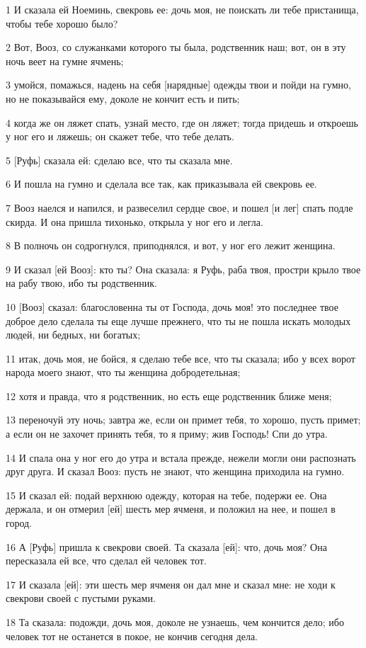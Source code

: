 \par 1 И сказала ей Ноеминь, свекровь ее: дочь моя, не поискать ли тебе пристанища, чтобы тебе хорошо было?
\par 2 Вот, Вооз, со служанками которого ты была, родственник наш; вот, он в эту ночь веет на гумне ячмень;
\par 3 умойся, помажься, надень на себя [нарядные] одежды твои и пойди на гумно, но не показывайся ему, доколе не кончит есть и пить;
\par 4 когда же он ляжет спать, узнай место, где он ляжет; тогда придешь и откроешь у ног его и ляжешь; он скажет тебе, что тебе делать.
\par 5 [Руфь] сказала ей: сделаю все, что ты сказала мне.
\par 6 И пошла на гумно и сделала все так, как приказывала ей свекровь ее.
\par 7 Вооз наелся и напился, и развеселил сердце свое, и пошел [и лег] спать подле скирда. И она пришла тихонько, открыла у ног его и легла.
\par 8 В полночь он содрогнулся, приподнялся, и вот, у ног его лежит женщина.
\par 9 И сказал [ей Вооз]: кто ты? Она сказала: я Руфь, раба твоя, простри крыло твое на рабу твою, ибо ты родственник.
\par 10 [Вооз] сказал: благословенна ты от Господа, дочь моя! это последнее твое доброе дело сделала ты еще лучше прежнего, что ты не пошла искать молодых людей, ни бедных, ни богатых;
\par 11 итак, дочь моя, не бойся, я сделаю тебе все, что ты сказала; ибо у всех ворот народа моего знают, что ты женщина добродетельная;
\par 12 хотя и правда, что я родственник, но есть еще родственник ближе меня;
\par 13 переночуй эту ночь; завтра же, если он примет тебя, то хорошо, пусть примет; а если он не захочет принять тебя, то я приму; жив Господь! Спи до утра.
\par 14 И спала она у ног его до утра и встала прежде, нежели могли они распознать друг друга. И сказал Вооз: пусть не знают, что женщина приходила на гумно.
\par 15 И сказал ей: подай верхнюю одежду, которая на тебе, подержи ее. Она держала, и он отмерил [ей] шесть мер ячменя, и положил на нее, и пошел в город.
\par 16 А [Руфь] пришла к свекрови своей. Та сказала [ей]: что, дочь моя? Она пересказала ей все, что сделал ей человек тот.
\par 17 И сказала [ей]: эти шесть мер ячменя он дал мне и сказал мне: не ходи к свекрови своей с пустыми руками.
\par 18 Та сказала: подожди, дочь моя, доколе не узнаешь, чем кончится дело; ибо человек тот не останется в покое, не кончив сегодня дела.

